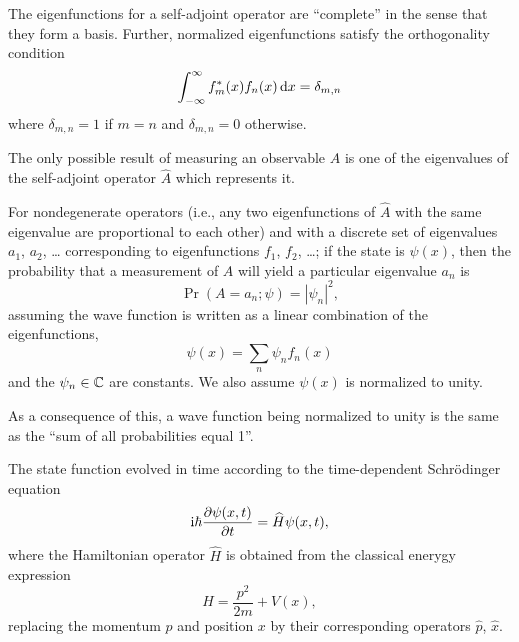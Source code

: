 \begin{remark}
The eigenfunctions for a self-adjoint operator are ``complete'' in the
sense that they form a basis. Further, normalized eigenfunctions satisfy
the orthogonality condition
\begin{equation}
\int^{\infty}_{-\infty}f_{m}^{*}(x)f_{n}(x)\,\mathrm{d} x = \delta_{m,n}
\end{equation}
where $\delta_{m,n}=1$ if $m=n$ and $\delta_{m,n}=0$ otherwise.
\end{remark}

The only possible result of measuring an observable $A$ is one of the
eigenvalues of the self-adjoint operator $\widehat{A}$ which represents
it.

\M
For nondegenerate operators (i.e., any two eigenfunctions of
$\widehat{A}$ with the same eigenvalue are proportional to each other)
and with a discrete set of eigenvalues $a_{1}$, $a_{2}$, \dots
corresponding to eigenfunctions $f_{1}$, $f_{2}$, \dots; if the state is
$\psi(x)$, then the probability that a measurement of $A$ will yield a
particular eigenvalue $a_{n}$ is
\begin{equation}
\Pr(A = a_{n}; \psi) = |\psi_{n}|^{2},
\end{equation}
assuming the wave function is written as a linear combination of the
eigenfunctions,
\begin{equation}
\psi(x) = \sum_{n}\psi_{n}f_{n}(x)
\end{equation}
and the $\psi_{n}\in\mathbb{C}$ are constants. We also assume $\psi(x)$ is
normalized to unity.

\begin{remark}
As a consequence of this, a wave function being normalized to unity is
the same as the ``sum of all probabilities equal 1''.
\end{remark}

The state function evolved in time according to the time-dependent
Schr\"{o}dinger equation
\begin{equation}
\mathrm{i}\hbar\frac{\partial\psi(x,t)}{\partial t} = \widehat{H}\psi(x,t),
\end{equation}
where the Hamiltonian operator $\widehat{H}$ is obtained from the
classical enerygy expression
\begin{equation}
H = \frac{p^{2}}{2m} + V(x),
\end{equation}
replacing the momentum $p$ and position $x$ by their corresponding
operators $\widehat{p}$, $\widehat{x}$.


